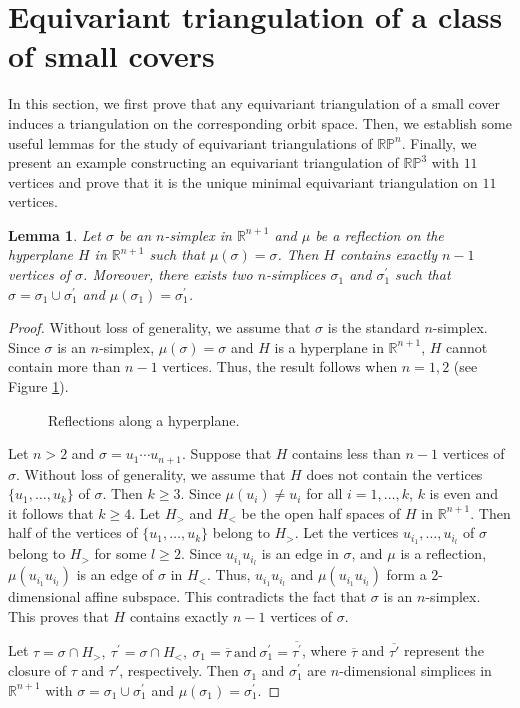 \documentclass[11pt]{amsart}
\numberwithin{equation}{section}
\newtheorem{lemma}[theorem]{Lemma}
\theoremstyle{definition}
\newcommand{\RP}{\mathbb{RP}}
\def \bb{\mathbb}
\def \RR{{\bb{R}}}
\def \bar{\overline}
\begin{document}
\section{Equivariant triangulation of a class of small covers}\label{equitri}
In this section, we first prove that any equivariant triangulation of a small cover induces a triangulation on the corresponding orbit space. Then, we establish some useful lemmas for the study of equivariant triangulations of $\RP^n$. Finally, we present an example constructing an equivariant triangulation of $\RP^3$ with $11$ vertices and prove that it is the unique minimal equivariant triangulation on $11$ vertices.



\begin{lemma}\label{lem2}
Let $\sigma$ be an $n$-simplex in $\RR^{n+1}$ and $\mu$ be a reflection on the hyperplane $H$ in $\RR^{n+1}$
such that $\mu(\sigma)=\sigma$. Then $H$ contains exactly $n-1$ vertices of $\sigma$. Moreover, there
exists two $n$-simplices $\sigma_1$ and $\sigma_1^{\prime}$ such that $\sigma = \sigma_1 \cup \sigma^{\prime}_1$ and $\mu(\sigma_1)=\sigma_1^{\prime}$.
\end{lemma}
\begin{proof}
Without loss of generality, we assume that $\sigma$ is the standard $n$-simplex.
Since $\sigma$ is an $n$-simplex, $\mu(\sigma)=\sigma$ and $H$ is a hyperplane in $\RR^{n+1}$, $H$ cannot contain more than $n-1$ vertices. Thus, the result follows when $n=1,2$ (see Figure \ref{rpn206}). 
\begin{figure}[ht]
\centerline{
\scalebox{0.88}{

 }  }
\caption {Reflections along a hyperplane.}
\label{rpn206}
\end{figure}

Let $n > 2$ and $\sigma=u_1\cdots u_{n+1}$. Suppose that $H$ contains less than $n-1$ vertices of $\sigma$. Without loss of generality, we assume that $H$ does not contain the vertices $\{u_1, \ldots, u_k\}$ of $\sigma$. Then $k \geq 3$.
 Since $\mu(u_i) \neq u_i$ for all $i = 1, \ldots, k$, $k$ is even and it follows that $k \geq 4$. Let $H_{>}$
and $H_{<}$ be the open half spaces of $H$ in $\RR^{n+1}$. Then half of the vertices of $\{u_1, \ldots,
u_k\}$ belong to $H_{>}$. Let the vertices $u_{i_1}, \ldots, u_{i_l}$ of $\sigma$ belong to $H_{>}$ for some $l\geq 2$. Since $u_{i_1}u_{i_l}$ is an edge in $\sigma$, and $\mu$ is a reflection, $\mu(u_{i_1}u_{i_l})$ is an edge of $\sigma$ in $H_{<}$.
Thus, $u_{i_1}u_{i_l}$ and $\mu(u_{i_1}u_{i_l})$ form a $2$-dimensional affine subspace. This contradicts the fact that $\sigma$ is an $n$-simplex. This proves that $H$ contains exactly $n-1$ vertices of $\sigma$.

Let $\tau =\sigma \cap H_{>}, ~ \tau^{\prime} = \sigma \cap H_{<}, ~ \sigma_1= \bar{\tau} ~\mbox{and} ~ \sigma_1^{\prime}= \bar{\tau^{\prime}}$, where $\bar{\tau}$ and $\bar{\tau'}$ represent the closure of $\tau$ and $\tau'$, respectively. Then $\sigma_1$ and $\sigma_1^{\prime}$ are
$n$-dimensional simplices in $\RR^{n+1}$ with $\sigma= \sigma_1 \cup \sigma_1^{\prime}$ and $\mu(\sigma_1)
=\sigma_1^{\prime}$.
\end{proof}
\end{document}
